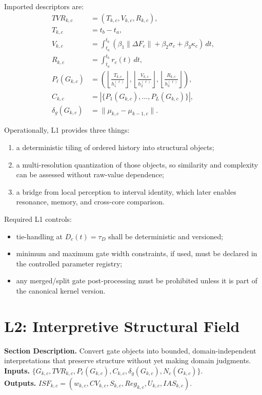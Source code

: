 \documentclass[11pt]{report}
\newcommand{\meta}[3]{\textbf{Section Description.} #1\\
\textbf{Inputs.} #2\\
\textbf{Outputs.} #3\par}
\begin{document}
Imported descriptors are:
\begin{align*}
TVR_{k,c} &= (T_{k,c},V_{k,c},R_{k,c}),\\
T_{k,c} &= t_b-t_a,\\
V_{k,c} &= \int_{t_a}^{t_b}(\beta_1\lVert\Delta F_c\rVert+\beta_2\sigma_c+\beta_3\kappa_c)\,dt,\\
R_{k,c} &= \int_{t_a}^{t_b}r_c(t)\,dt,\\
P_\ell(G_{k,c}) &= \left(\left\lfloor\frac{T_{k,c}}{h_1^{(\ell)}}\right\rfloor,\left\lfloor\frac{V_{k,c}}{h_2^{(\ell)}}\right\rfloor,\left\lfloor\frac{R_{k,c}}{h_3^{(\ell)}}\right\rfloor\right),\\
C_{k,c} &= \left|\{P_1(G_{k,c}),\dots,P_L(G_{k,c})\}\right|,\\
\delta_g(G_{k,c}) &= \lVert \mu_{k,c}-\mu_{k-1,c}\rVert.
\end{align*}

Operationally, L1 provides three things:
\begin{enumerate}[leftmargin=1.2cm]
    \item a deterministic tiling of ordered history into structural objects;
    \item a multi-resolution quantization of those objects, so similarity and complexity can be assessed without raw-value dependence;
    \item a bridge from local perception to interval identity, which later enables resonance, memory, and cross-core comparison.
\end{enumerate}

Required L1 controls:
\begin{itemize}
    \item tie-handling at $D_c(t)=\tau_D$ shall be deterministic and versioned;
    \item minimum and maximum gate width constraints, if used, must be declared in the controlled parameter registry;
    \item any merged/split gate post-processing must be prohibited unless it is part of the canonical kernel version.
\end{itemize}

\section{L2: Interpretive Structural Field}
\meta{Convert gate objects into bounded, domain-independent interpretations that preserve structure without yet making domain judgments.}{$\{G_{k,c},TVR_{k,c},P_\ell(G_{k,c}),C_{k,c},\delta_g(G_{k,c}),N_c(G_{k,c})\}$.}{$ISF_{k,c}=(w_{k,c},CV_{k,c},S_{k,c},Reg_{k,c},U_{k,c},IAS_{k,c})$.}
\end{document}
